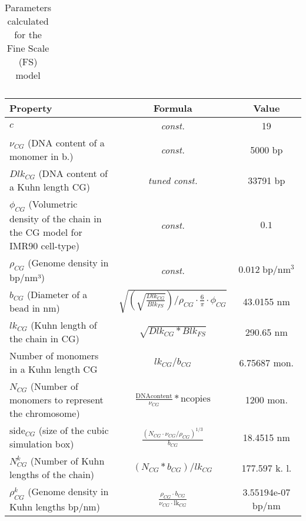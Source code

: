 \begin{itemize}
\begin{table}[H]
\begin{tabular}{|l|l|c|}
    \end{tabular}
    \caption{Parameters calculated for the Fine Scale (FS) model}
    \label{table: parameters FS}
  \end{table}
    
    
    \begin{table}[H]
        \begin{tabular}{|l|c|c|}
            \hline
            \textbf{Property} & \textbf{Formula} & \textbf{Value}\\
    \hline
    \textbf{$c$} & \textit{const.} & 19\\
    \hline
    $\nu_{CG}$ (DNA content of a monomer in b.) & \textit{const.} & 5000 bp\\
    \hline
    $Dlk_{CG}$ (DNA content of a Kuhn length CG) & \textit{tuned const.} & 33791 bp\\
    \hline
    $\phi_{CG}$ (Volumetric density of the chain in the CG model for IMR90 cell-type) & \textit{const.} & $0.1$ \\ %
    \hline
    \textbf{$\rho_{CG}$} (Genome density in bp/nm³) & \textit{const.} & $0.012\; \text{bp}/\text{nm}^3$\\
    \hline
    $b_{CG}$ (Diameter of a bead in nm) & $\sqrt{\left(\sqrt{\frac{{Dlk_{CG}}}{{Blk_{FS}}}}\right) / \rho_{CG} \cdot \frac{6}{\pi} \cdot \phi_{CG}}
    $ & 43.0155 nm\\
    \hline
    \textbf{$lk_{CG}$} (Kuhn length of the chain  in CG) & $\sqrt{Dlk_{CG} * Blk_{FS}}$ & 290.65 nm \\
    \hline
    Number of monomers in a Kuhn length CG & $lk_{CG}/b_{CG}$ & 6.75687 mon.\\
    \hline
    \textbf{$N_{CG}$} (Number of monomers to represent the chromosome) & $\frac{\text{DNAcontent}}{\nu_{CG}} * \text{ncopies}$& 1200 mon.\\
    \hline
    $\text{side}_{CG}$ (size of the cubic simulation box) & $\frac{{(N_{CG} \cdot \nu_{CG} / \rho_{CG})^{1/3}}}{{b_{CG}}}
    $ & 18.4515 nm\\
    \hline
    \textbf{$N^k_{CG}$} (Number of Kuhn lengths of the chain) & $(N_{CG} * b_{CG})/{lk_{CG}}$ & 177.597 k. l.\\
    \hline
    \textbf{$\rho^k_{CG}$} (Genome density in Kuhn lengths bp/nm) & $\frac{\rho_{CG} \cdot b_{CG}}{\nu_{CG} \cdot \text{lk}_{CG}}$ & $3.55194$e-07 bp/nm \\
    \hline
    

\end{tabular}
\end{table}
\end{itemize}
